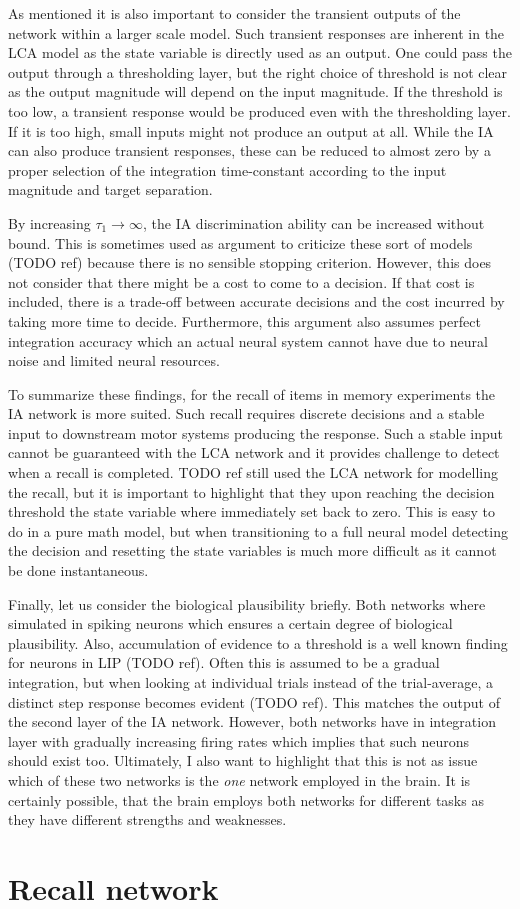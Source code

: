 As mentioned it is also important to consider the transient outputs of the network within a larger scale model.
Such transient responses are inherent in the LCA model as the state variable is directly used as an output.
One could pass the output through a thresholding layer, but the right choice of threshold is not clear as the output magnitude will depend on the input magnitude.
If the threshold is too low, a transient response would be produced even with the thresholding layer.
If it is too high, small inputs might not produce an output at all.
While the IA can also produce transient responses, these can be reduced to almost zero by a proper selection of the integration time-constant according to the input magnitude and target separation.

By increasing $\tau_1 \rightarrow \infty$, the IA discrimination ability can be increased without bound.
This is sometimes used as argument to criticize these sort of models (TODO ref) because there is no sensible stopping criterion.
However, this does not consider that there might be a cost to come to a decision.
If that cost is included, there is a trade-off between accurate decisions and the cost incurred by taking more time to decide.
Furthermore, this argument also assumes perfect integration accuracy which an actual neural system cannot have due to neural noise and limited neural resources.

To summarize these findings, for the recall of items in memory experiments the IA network is more suited.
Such recall requires discrete decisions and a stable input to downstream motor systems producing the response.
Such a stable input cannot be guaranteed with the LCA network and it provides challenge to detect when a recall is completed.
TODO ref still used the LCA network for modelling the recall, but it is important to highlight that they upon reaching the decision threshold the state variable where immediately set back to zero.
This is easy to do in a pure math model, but when transitioning to a full neural model detecting the decision and resetting the state variables is much more difficult as it cannot be done instantaneous.

Finally, let us consider the biological plausibility briefly.
Both networks where simulated in spiking neurons which ensures a certain degree of biological plausibility.
Also, accumulation of evidence to a threshold is a well known finding for neurons in LIP (TODO ref).
Often this is assumed to be a gradual integration, but when looking at individual trials instead of the trial-average, a distinct step response becomes evident (TODO ref).
This matches the output of the second layer of the IA network.
However, both networks have in integration layer with gradually increasing firing rates which implies that such neurons should exist too.
Ultimately, I also want to highlight that this is not as issue which of these two networks is the \emph{one} network employed in the brain.
It is certainly possible, that the brain employs both networks for different tasks as they have different strengths and weaknesses.


\section{Recall network}
